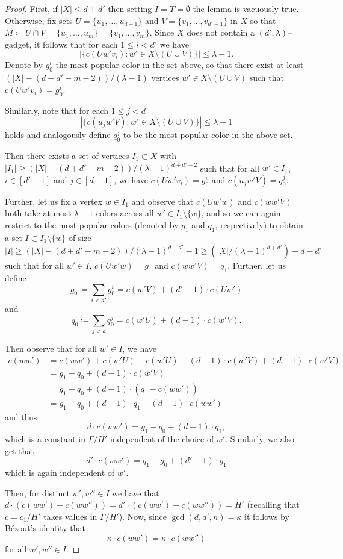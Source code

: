 \documentclass[10pt,a4paper]{amsart}
\begin{document}
\begin{proof}
First, if $|X|\leq d+d'$ then setting $I=T=\emptyset$ the lemma is vacuously true. Otherwise, fix sets $U=\{u_1,\ldots,u_{d-1}\}$ and $V=\{v_1,\ldots,v_{d'-1}\}$ in $X$ so that $M\coloneqq U\cap V =\{u_1,\ldots,u_{m}\}=\{v_1,\ldots,v_{m}\}$. Since $X$ does not contain a $(d', \lambda)$--gadget, it follows that for each $1\leq i<d'$ we have
\[|\{c(Uw'v_i):w'\in X\setminus (U\cup V)\}|\leq \lambda-1.\]
Denote by $g_0^i$ the most popular color in the set above, so that there exist at least $(|X|-(d+d'-m-2))/(\lambda-1)$ vertices $w'\in X\setminus (U\cup V)$ such that $c(Uw'v_i)=g_0^i$.

Similarly, note that for each $1\leq j<d$
\[|\{c(u_jw'V):w'\in X\setminus (U\cup V)\}|\leq \lambda-1\]
holds and analogously define $q_0^j$ to be the most popular color in the above set.

Then there exists a set of vertices $I_1\subset X$ with $|I_1|\geq (|X|-(d+d'-m-2))/(\lambda-1)^{d+d'-2}$ such that for all $w'\in I_1$, $i \in [d'-1]$ and $j \in [d-1]$, we have $c(Uw'v_i)=g_0^i$ and $c(u_jw'V)=q_0^j$. 

Further, let us fix a vertex $w\in I_1$ and observe that $c(Uw'w)$ and $c(ww'V)$ both take at most $\lambda-1$ colors across all $w' \in I_1\setminus \{w\}$, and so we can again restrict to the most popular colors (denoted by $g_1$ and $q_1$, respectively) to obtain a set $I\subset I_1\setminus\{w\}$ of size
\[|I|\geq \left(|X|-(d+d'-m-2)\right)/(\lambda-1)^{d+d'}-1\geq \left(|X|/(\lambda-1)^{d+d'}\right) -d-d'\] 
such that for all $w'\in I$, $c(Uw'w)=g_1$ and $c(ww'V)=q_1$. Further, let us define $$g_0\coloneqq \sum_{i< d'}g_0^i = c(w'V) + (d'-1)\cdot c(Uw')$$ and $$q_0\coloneqq \sum_{j< d} q_0^j = c(w'U) + (d-1)\cdot c(w'V).$$

Then observe that for all $w'\in I$, we have
$$
\begin{aligned}
c(ww')&=c(ww') +c(w'U) - c(w'U) - (d-1)\cdot c(w'V)+(d-1)\cdot c(w'V)\\
&=g_1-q_0+(d-1)\cdot c(w'V)\\
&=g_1-q_0+(d-1)\cdot(q_1-c(ww'))\\
&= g_1-q_0+(d-1)\cdot q_1-(d-1)\cdot c(ww')
\end{aligned}$$
and thus $$d\cdot c(ww')=g_1-q_0+(d-1)\cdot q_1,$$
which is a constant in $\Gamma/H'$ independent of the choice of $w'$. Similarly, we also get that $$d'\cdot c(ww') =q_1-g_0+(d'-1)\cdot g_1$$
which is again independent of $w'$.

Then, for distinct $w',w''\in I$ we have that $d\cdot (c(ww')-c(ww''))=d'\cdot (c(ww')-c(ww''))=H'$ (recalling that $c=c_1/H'$ takes values in $\Gamma/H'$). Now, since $\gcd(d,d',n)=\kappa$ it follows by B\'ezout's identity that \[\kappa\cdot c(ww')=\kappa\cdot c(ww'')\]
for all $w', w''\in I$.


\end{proof}
\end{document}
